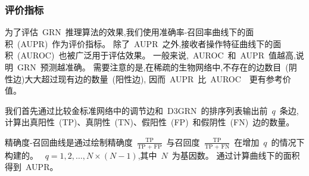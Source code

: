 \begin{table}[!htbp]
\centering
\caption{实验数据集详情}

\label{datasets}
\end{table}

\subsubsection{评价指标}

为了评估~GRN~推理算法的效果,我们使用准确率-召回率曲线下的面积~(AUPR)~作为评价指标。
除了~AUPR~之外,接收者操作特征曲线下的面积~(AUROC)~也被广泛用于评估效果。
一般来说,~AUROC~和~AUPR~值越高,说明~GRN~预测越准确。
需要注意的是,在稀疏的生物网络中,不存在的边数目~(阴性边)大大超过现有边的数量~(阳性边),
因而~AUPR~比~AUROC~\cite{saito2015precision}~更有参考价值。

我们首先通过比较金标准网络中的调节边和~D3GRN~的排序列表输出前~$q$~条边,
计算出真阳性~(TP)、真阴性~(TN)、假阳性~(FP)~和假阴性~(FN)~边的数量。

精确度-召回曲线是通过绘制精确度~$\frac{\text{TP}}{\text{TP + FP}}$~与召回度~$\frac{\text{TP}}{\text{TP + FN}}$~在增加~$q$~的情况下构建的。
~$q = 1,2,\ldots,N\times(N-1)$,其中~$N$~为基因数。
通过计算曲线下的面积得到~AUPR。

